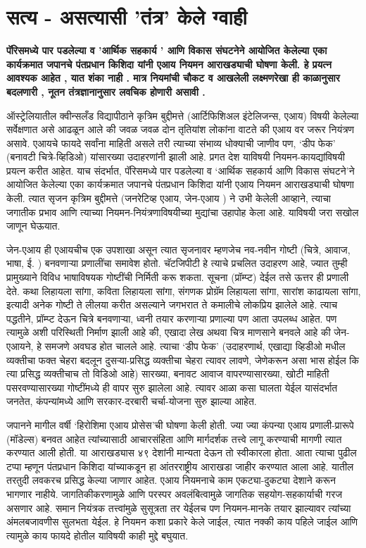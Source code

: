 \chapter{सत्य - असत्यासी 'तंत्र' केले ग्वाही}

{\textbf{पॅरिसमध्ये पार पडलेल्या व 'आर्थिक सहकार्य '  आणि विकास संघटनेने आयोजित केलेल्या एका कार्यक्रमात जपानचे पंतप्रधान किशिदा यांनी एआय नियमन आराखड्याची घोषणा केली. हे प्रयत्न आवश्यक आहेत ,  यात शंका नाही .  मात्र नियमांची चौकट व आखलेली लक्ष्मणरेखा ही काळानुसार बदलणारी , नूतन तंत्रज्ञानानुसार लवचिक होणारी असावी . }}

ऑस्ट्रेलियातील क्वीन्सलँड विद्यापीठाने कृत्रिम बुद्दीमत्ते (आर्टिफिशिअल इंटेलिजन्स, एआय) विषयी केलेल्या सर्वेक्षणात असे आढळून आले की जवळ जवळ दोन तृतियांश लोकांना वाटते की एआय वर जरूर नियंत्रण असावे. एआयचे फायदे सर्वांना माहिती असले तरी त्याच्या संभाव्य धोक्याची जाणीव पण, ‘डीप फेक’ (बनावटी चित्रे-व्हिडिओ) यांसारख्या उदाहरणांनी झाली आहे. प्रगत देश याविषयी नियमन-कायद्यांविषयी प्रयत्न करीत आहेत. याच संदर्भात, पॅरिसमध्ये पार पडलेल्या व ‘आर्थिक सहकार्य आणि विकास संघटने’ने आयोजित केलेल्या एका कार्यक्रमात जपानचे पंतप्रधान किशिदा यांनी एआय नियमन आराखड्याची घोषणा केली. त्यात सृजन कृत्रिम बुद्दीमत्ते (जनरेटिव्ह एआय, जेन-एआय ) ने उभी केलेली आव्हाने, त्याचा जगातीक प्रभाव आणि त्याच्या नियमन-नियंत्रणाविषयीच्या मुद्यांचा उहापोह केला आहे. याविषयी जरा सखोल जाणून घेऊयात.

जेन-एआय ही एआयचीच एक उपशाखा असून त्यात सृजनावर म्हणजेच नव-नवीन गोष्टी (चित्रे, आवाज, भाषा, ई. ) बनवणाऱ्या प्रणालींचा समावेश होतो. चॅटजिपीटी हे त्याचे प्रचलित उदाहरण आहे, ज्यात तुम्ही प्रामुख्याने विविध भाषाविषयक गोष्टींची निर्मिती करू शकता. सूचना (प्रॉम्प्ट) देईल तसे ऊत्तर ही प्रणाली देते. कथा लिहायला सांगा, कविता लिहायला सांगा, संगणक प्रोग्रॅम लिहायला सांगा, सारांश काढायला सांगा, इत्यादी अनेक गोष्टी ते लीलया करीत असल्याने जगभरात ते कमालीचे लोकप्रिय झालेले आहे. त्याच पद्धतीने, प्रॉम्प्ट देऊन चित्रे बनवणाऱ्या, ध्वनी तयार करणाऱ्या प्रणाल्या पण आता उपलब्ध आहेत. पण त्यामुळे अशी परिस्थिती निर्माण झाली आहे की, एखादा लेख अथवा चित्र माणसाने बनवले आहे की जेन-एआयने, हे समजणे अवघड होत चालले आहे. त्याचा ‘डीप फेक’ (उदाहरणार्थ, एखाद्या व्हिडीओ मधील व्यक्तीचा फक्त चेहरा बदलून दुसऱ्या-प्रसिद्ध व्यक्तीचा चेहरा त्यावर लावणे, जेणेकरून असा भास होईल कि त्या प्रसिद्ध व्यक्तीचाच तो विडिओ आहे) सारख्या, बनावट आवाज वापरण्यासारख्या, खोटी माहिती पसरवण्यासारख्या गोष्टींमध्ये ही वापर सुरु झालेला आहे. त्यावर आळा कसा घालता येईल यासंदर्भात जनतेत, कंपन्यांमध्ये आणि सरकार-दरबारी चर्चा-योजना सुरु झाल्या आहेत.

जपानने मागील वर्षी ‘हिरोशिमा एआय प्रोसेस’ची घोषणा केली होती. ज्या ज्या कंपन्या एआय प्रणाली-प्रारूपे (मॉडेल्स) बनवत आहेत त्यांच्यासाठी आचारसंहिता आणि मार्गदर्शक तत्त्वे लागू करण्याची मागणी त्यात करण्यात आली होती. या आराखड्यास ४९ देशांनी मान्यता देऊन तो स्वीकारला होता. आता त्याचा पुढील टप्पा म्हणून पंतप्रधान किशिदा यांच्याकडून हा आंतरराष्ट्रीय आराखडा जाहीर करण्यात आला आहे. यातील तरतुदी लवकरच प्रसिद्ध केल्या जाणार आहेत. एआय नियमनाचे काम एकट्या-दुकट्या देशाने करून भागणार नाहीये. जागतिकीकरणामुळे आणि परस्पर अवलंबित्वामुळे जागतिक सहयोग-सहकार्याची गरज असणार आहे. समान नियंत्रक तत्त्वांमुळे सुसूत्रता तर येईलच पण नियमन-मानके तयार झाल्यावर त्यांच्या अंमलबजावणीस सुलभता येईल. हे नियमन कशा प्रकारे केले जाईल, त्यात नक्की काय पहिले जाईल आणि त्यामुळे काय फायदे होतील याविषयी काही मुद्दे बघुयात.

